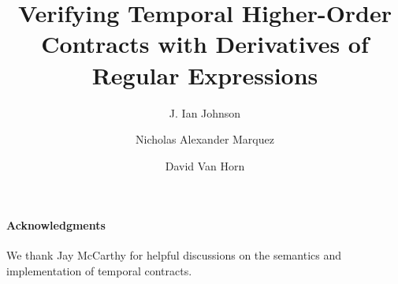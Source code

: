 \documentclass[article]{llncs}
\begin{document}
\title{Verifying Temporal Higher-Order Contracts with Derivatives of Regular Expressions}


\author{J. Ian Johnson \and Nicholas Alexander Marquez \and David Van Horn}

\maketitle

\begin{abstract}

\end{abstract}



\paragraph{Acknowledgments}{We thank Jay McCarthy for helpful discussions on the semantics
and implementation of temporal contracts.}


\end{document}
